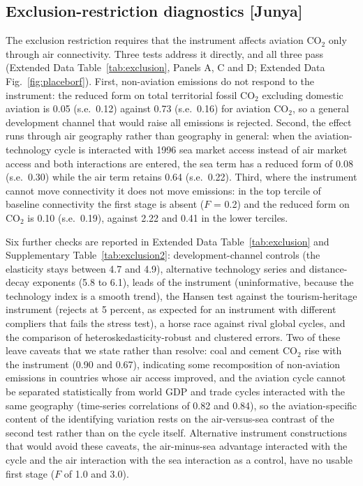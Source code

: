 \documentclass[12pt]{article}
\begin{document}
\subsection*{Exclusion-restriction diagnostics [Junya]}
The exclusion restriction requires that the instrument affects aviation
CO$_2$ only through air connectivity. Three tests address it directly, and
all three pass (Extended Data Table~\ref{tab:exclusion}, Panels A, C and D;
Extended Data Fig.~\ref{fig:placeborf}). First, non-aviation emissions do
not respond to the instrument: the reduced form on total territorial fossil
CO$_2$ excluding domestic aviation is 0.05 (s.e.\ 0.12) against 0.73 (s.e.\
0.16) for aviation CO$_2$, so a general development channel that would
raise all emissions is rejected. Second, the effect runs through air
geography rather than geography in general: when the aviation-technology
cycle is interacted with 1996 sea market access instead of air market
access and both interactions are entered, the sea term has a reduced form
of 0.08 (s.e.\ 0.30) while the air term retains 0.64 (s.e.\ 0.22). Third,
where the instrument cannot move connectivity it does not move emissions:
in the top tercile of baseline connectivity the first stage is absent
($F$ = 0.2) and the reduced form on CO$_2$ is 0.10 (s.e.\ 0.19), against
2.22 and 0.41 in the lower terciles.

Six further checks are reported in Extended Data Table~\ref{tab:exclusion}
and Supplementary Table~\ref{tab:exclusion2}: development-channel controls
(the elasticity stays between 4.7 and 4.9), alternative technology series
and distance-decay exponents (5.8 to 6.1), leads of the instrument
(uninformative, because the technology index is a smooth trend), the
Hansen test against the tourism-heritage instrument (rejects at 5 percent,
as expected for an instrument with different compliers that fails the
stress test), a horse race against rival global cycles, and the comparison
of heteroskedasticity-robust and clustered errors. Two of these leave
caveats that we state rather than resolve: coal and cement CO$_2$ rise
with the instrument (0.90 and 0.67), indicating some recomposition of
non-aviation emissions in countries whose air access improved, and the
aviation cycle cannot be separated statistically from world GDP and trade
cycles interacted with the same geography (time-series correlations of
0.82 and 0.84), so the aviation-specific content of the identifying
variation rests on the air-versus-sea contrast of the second test rather
than on the cycle itself. Alternative instrument constructions that would
avoid these caveats, the air-minus-sea advantage interacted with the
cycle and the air interaction with the sea interaction as a control, have
no usable first stage ($F$ of 1.0 and 3.0).
\end{document}
